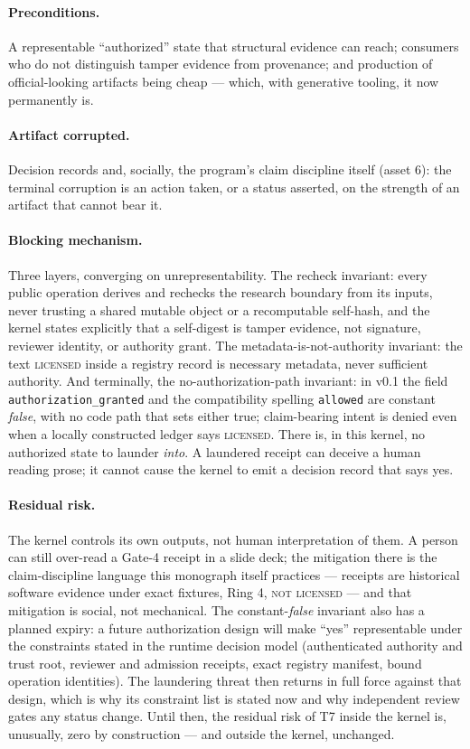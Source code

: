 \paragraph{Preconditions.} A representable ``authorized'' state that structural evidence can reach; consumers who do not distinguish tamper evidence from provenance; and production of official-looking artifacts being cheap --- which, with generative tooling, it now permanently is.

\paragraph{Artifact corrupted.} Decision records and, socially, the program's claim discipline itself (asset 6): the terminal corruption is an action taken, or a status asserted, on the strength of an artifact that cannot bear it.

\paragraph{Blocking mechanism.} Three layers, converging on unrepresentability. The recheck invariant: every public operation derives and rechecks the research boundary from its inputs, never trusting a shared mutable object or a recomputable self-hash, and the kernel states explicitly that a self-digest is tamper evidence, not signature, reviewer identity, or authority grant. The metadata-is-not-authority invariant: the text \textsc{licensed} inside a registry record is necessary metadata, never sufficient authority. And terminally, the no-authorization-path invariant: in v0.1 the field \texttt{authorization\_granted} and the compatibility spelling \texttt{allowed} are constant \emph{false}, with no code path that sets either true; claim-bearing intent is denied even when a locally constructed ledger says \textsc{licensed}. There is, in this kernel, no authorized state to launder \emph{into}. A laundered receipt can deceive a human reading prose; it cannot cause the kernel to emit a decision record that says yes.

\paragraph{Residual risk.} The kernel controls its own outputs, not human interpretation of them. A person can still over-read a Gate-4 receipt in a slide deck; the mitigation there is the claim-discipline language this monograph itself practices --- receipts are historical software evidence under exact fixtures, Ring 4, \textsc{not licensed} --- and that mitigation is social, not mechanical. The constant-\emph{false} invariant also has a planned expiry: a future authorization design will make ``yes'' representable under the constraints stated in the runtime decision model (authenticated authority and trust root, reviewer and admission receipts, exact registry manifest, bound operation identities). The laundering threat then returns in full force against that design, which is why its constraint list is stated now and why independent review gates any status change. Until then, the residual risk of T7 inside the kernel is, unusually, zero by construction --- and outside the kernel, unchanged.

